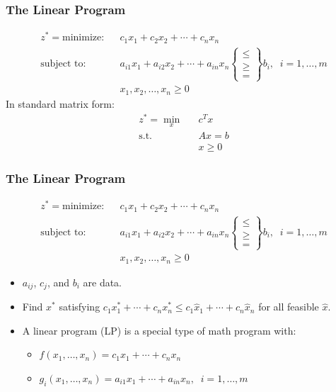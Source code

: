 \documentclass[12pt,handout]{beamer}
\begin{document}
\begin{frame}
\frametitle{The Linear Program}
\begin{eqnarray}
z^* = \mbox{minimize:} && c_1 x_1 + c_2 x_2 + \cdots + c_n x_n \nonumber \\
\mbox{subject to:} &&a_{i1} x_1 + a_{i2} x_2 + \cdots + a_{in} x_n
\begin{Bmatrix}   \le \\
                   \ge \\
                    =
\end{Bmatrix}
b_i,\;\;i = 1,\ldots,m \nonumber \\
&&x_1, x_2, \ldots, x_n \ge 0 \nonumber
\end{eqnarray}
In standard matrix form:
\begin{eqnarray}
z^* = \min_{x} && c^T x \nonumber \\
\mbox{s.t.} && Ax = b \nonumber \\
&& x \ge 0 \nonumber
\end{eqnarray}
\end{frame}

\begin{frame}
\frametitle{The Linear Program}
\begin{eqnarray}
z^* = \mbox{minimize:} && c_1 x_1 + c_2 x_2 + \cdots + c_n x_n \nonumber \\
\mbox{subject to:} &&a_{i1} x_1 + a_{i2} x_2 + \cdots + a_{in} x_n
\begin{Bmatrix}   \le \\
                   \ge \\
                    =
\end{Bmatrix}
b_i,\;\;i = 1,\ldots,m \nonumber \\
&&x_1, x_2, \ldots, x_n \ge 0 \nonumber
\end{eqnarray}
\begin{itemize}
\item $a_{ij}$, $c_j$, and $b_i$ are data.
\item Find $x^*$ satisfying $c_1 x_1^* + \cdots + c_n x_n^* \le c_1 \hat{x}_1 + \cdots + c_n \hat{x}_n$ for all feasible $\hat{x}$.
\item A linear program (LP) is a special type of math program with:
    \begin{itemize}
    \item $f(x_1,\ldots,x_n) = c_1 x_1 + \cdots + c_n x_n$
    \item $g_i(x_1,\ldots,x_n) = a_{i1} x_1 + \cdots + a_{in} x_n,\;\;i = 1,\ldots,m$
    \end{itemize}
\end{itemize}
\end{frame}
\end{document}
